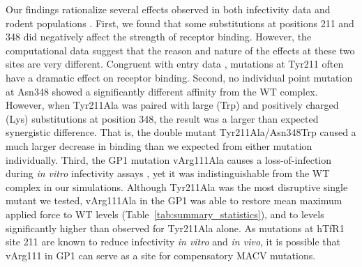 \documentclass[12pt]{article}
\begin{document}
Our findings rationalize several effects observed in both infectivity data and rodent populations \citep{Rad2008,Rad20111}. First, we found that some substitutions at positions 211 and 348 did negatively affect the strength of receptor binding. However, the computational data suggest that the reason and nature of the effects at these two sites are very different. Congruent with entry data \citep{Rad2008,Rad20111}, mutations at Tyr211 often have a dramatic effect on receptor binding. Second, no individual point mutation at Asn348 showed a significantly different affinity from the WT complex. However, when Tyr211Ala was paired with large (Trp) and positively charged (Lys) substitutions at position 348, the result was a larger than expected synergistic difference. That is, the double mutant Tyr211Ala/Asn348Trp caused a much larger decrease in binding than we expected from either mutation individually. Third, the GP1 mutation vArg111Ala causes a loss-of-infection during \textit{in vitro} infectivity assays \citep{Rad20112}, yet it was indistinguishable from the WT complex in our simulations. Although Tyr211Ala was the most disruptive single mutant we tested, vArg111Ala in the GP1 was able to restore mean maximum applied force to WT levels (Table~\ref{tab:summary_statistics}), and to levels significantly higher than observed for Tyr211Ala alone. As mutations at hTfR1 site 211 are known to reduce infectivity \emph{in vitro} and \emph{in vivo}, it is possible that vArg111 in GP1 can serve as a site for compensatory MACV mutations.

\end{document}
